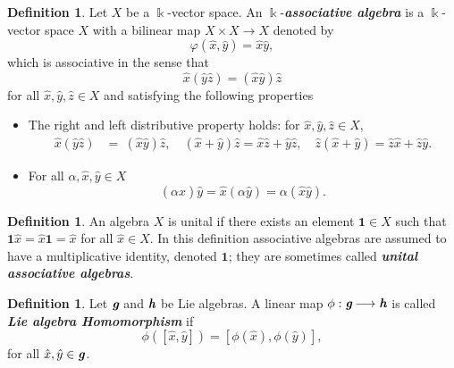 \documentclass[12pt,a4paper]{article}
\theoremstyle{plain}
\theoremstyle{definition}
\newtheorem{definition}[theorem]{Definition}
\theoremstyle{remark}
\begin{document}
\begin{definition}\cite{Cooperstein2015}
Let $X$ be a $\Bbbk$-vector space. An $\Bbbk$-\textit{\textbf{associative algebra}} is a $\Bbbk$-vector space $X$ with a bilinear map $X\times X\longrightarrow X$ denoted by 
\begin{equation*}
\varphi (\hat{x},\hat{y})=\hat{x}\hat{y},
\end{equation*}
which is associative in the sense that 
\begin{equation*}
\hat{x}(\hat{y}\hat{z})=(\hat{x}\hat{y})\hat{z}
\end{equation*}
for all $\hat{x}, \hat{y}, \hat{z}\in X$ and satisfying the following properties
  \begin{itemize}
      \item [\rm (1)] The right and left distributive property holds: for $\hat{x}, \hat{y}, \hat{z}\in X$, 
      \begin{align*}
      \hat{x}(\hat{y}\hat{z}) & = \ (\hat{x}\hat{y})\hat{z},\quad    
      (\hat{x}+\hat{y})\hat{z}=\hat{x}\hat{z}+\hat{y}\hat{z},\quad
      \hat{z}(\hat{x}+\hat{y})=\hat{z}\hat{x}+\hat{z}\hat{y}.
      \end{align*}
      \item [\rm (2)] For all $\alpha ,\hat{x}, \hat{y}\in X$ 
      \begin{equation*}
      (\alpha\hat{x})\hat{y}=\hat{x}(\alpha\hat{y})=\alpha (\hat{x}\hat{y}).
      \end{equation*}
  \end{itemize}
\end{definition}
\begin{definition}
    An algebra $X$ is unital if there exists an element $\mathbf{1}\in X$ such that $\mathbf{1}\hat{x}=\hat{x}\mathbf{1}=\hat{x}$ for all $\hat{x}\in X$. In this definition associative algebras are assumed to have a multiplicative identity, denoted $\mathbf{1}$; they are sometimes called \textit{\textbf{unital associative algebras}}. 
\end{definition}

\begin{definition}\cite{Hall2010}
    Let $\textit{\textbf{g}}$ and $\textit{\textbf{h}}$ be Lie algebras. A linear map $\phi : \textit{\textbf{g}}\longrightarrow\textit{\textbf{h}}$ is called \textit{\textbf{Lie algebra Homomorphism}} if 
    \begin{equation*}
    \phi ([\hat{x}, \hat{y}])=[\phi (\hat{x}),\phi (\hat{y})],
    \end{equation*}
    for all $\hat{x}, \hat{y}\in\textit{\textbf{g}}$.
\end{definition}
\end{document}

